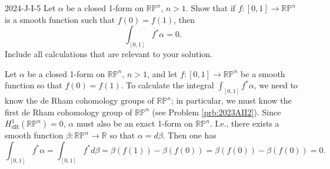 \documentclass{article}
\begin{document}
	\begin{prb}{2024-J-I-5}
		Let $\alpha$ be a closed 1-form on $\mathbb{RP}^{n}$, $n > 1$. Show that if $f: [0,1] \to \mathbb{RP}^{n}$ is a smooth function such that $f(0) = f(1)$, then 
		\begin{equation*}
			\int_{[0,1]}f^{\ast}\alpha = 0. 
		\end{equation*}
		Include all calculations that are relevant to your solution. 
	\end{prb}
	Let $\alpha$ be a closed 1-form on $\mathbb{RP}^{n}$, $n > 1$, and let $f: [0,1] \to \mathbb{RP}^{n}$ be a smooth function so that $f(0) = f(1)$. To calculate the integral $\int_{[0,1]}f^{\ast}\alpha$, we need to know the de Rham cohomology groups of $\mathbb{RP}^{n}$; in particular, we must know the first de Rham cohomology group of $\mathbb{RP}^{n}$ (see Problem \ref{prb:2023AII2}). Since $H^{1}_{\text{dR}}(\mathbb{RP}^{n}) = 0$, $\alpha$ must also be an exact 1-form on $\mathbb{RP}^{n}$. I.e., there exists a smooth function $\beta: \mathbb{RP}^{n} \to \mathbb{R}$ so that $\alpha = d\beta$. Then one has 
	\begin{equation*}
		\int_{[0,1]}f^{\ast}\alpha = \int_{[0,1]}f^{\ast}d\beta = \beta(f(1)) - \beta(f(0)) = \beta(f(0)) - \beta(f(0)) =0. 
	\end{equation*}
	
\end{document}
